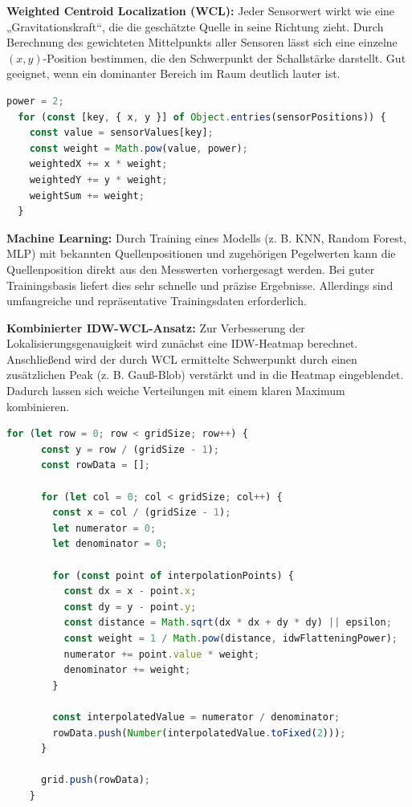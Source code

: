 \textbf{Weighted Centroid Localization (WCL):}  
Jeder Sensorwert wirkt wie eine „Gravitationskraft“, die die geschätzte Quelle in seine Richtung zieht. Durch Berechnung des gewichteten Mittelpunkts aller Sensoren lässt sich eine einzelne $(x,y)$-Position bestimmen, die den Schwerpunkt der Schallstärke darstellt. Gut geeignet, wenn ein dominanter Bereich im Raum deutlich lauter ist.
\begin{lstlisting}[language=JavaScript, caption={Weighted Centroid Localization (WCL)}]
	power = 2;    
  for (const [key, { x, y }] of Object.entries(sensorPositions)) {
    const value = sensorValues[key];
    const weight = Math.pow(value, power);
    weightedX += x * weight;
    weightedY += y * weight;
    weightSum += weight;
  }
\end{lstlisting}
\begin{minipage}[b]{0.5\textwidth}
\end{minipage}

\textbf{Machine Learning:}  
Durch Training eines Modells (z. B. KNN, Random Forest, MLP) mit bekannten Quellenpositionen und zugehörigen Pegelwerten kann die Quellenposition direkt aus den Messwerten vorhergesagt werden. Bei guter Trainingsbasis liefert dies sehr schnelle und präzise Ergebnisse. Allerdings sind umfangreiche und repräsentative Trainingsdaten erforderlich.

\textbf{Kombinierter IDW-WCL-Ansatz:}  
Zur Verbesserung der Lokalisierungsgenauigkeit wird zunächst eine IDW-Heatmap berechnet. Anschließend wird der durch WCL ermittelte Schwerpunkt durch einen zusätzlichen Peak (z. B. Gauß-Blob) verstärkt und in die Heatmap eingeblendet. Dadurch lassen sich weiche Verteilungen mit einem klaren Maximum kombinieren.
\begin{lstlisting}[language=JavaScript, caption={Kombinierter IDW-WCL-Ansatz}]
    for (let row = 0; row < gridSize; row++) {
      const y = row / (gridSize - 1);
      const rowData = [];

      for (let col = 0; col < gridSize; col++) {
        const x = col / (gridSize - 1);
        let numerator = 0;
        let denominator = 0;

        for (const point of interpolationPoints) {
          const dx = x - point.x;
          const dy = y - point.y;
          const distance = Math.sqrt(dx * dx + dy * dy) || epsilon;
          const weight = 1 / Math.pow(distance, idwFlatteningPower);
          numerator += point.value * weight;
          denominator += weight;
        }

        const interpolatedValue = numerator / denominator;
        rowData.push(Number(interpolatedValue.toFixed(2)));
      }

      grid.push(rowData);
    }
\end{lstlisting}
\begin{minipage}[b]{0.5\textwidth}
\end{minipage}


